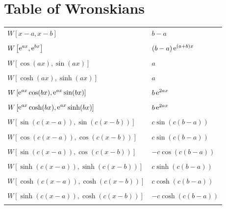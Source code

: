 \raggedbottom
\chapter{Table of Wronskians}
\raggedbottom 


\setlongtables
\begin{longtable}{ll}
  $\displaystyle W \left[ x-a, x-b \right]$
  & $\displaystyle b-a$ \\
  \\
  $\displaystyle W \left[ \mathop{\mathrm{e}}\nolimits^{a x}, \mathop{\mathrm{e}}\nolimits^{b x} \right]$
  & $\displaystyle (b-a) \mathop{\mathrm{e}}\nolimits^{(a+b) x}$ \\
  \\
  $\displaystyle W \left[ \cos(a x), \sin(a x) \right]$
  & $\displaystyle a$ \\
  \\
  $\displaystyle W \left[ \cosh(a x), \sinh(a x) \right]$
  & $\displaystyle a$ \\
  \\
  $\displaystyle W \left[ \mathop{\mathrm{e}}\nolimits^{a x} \cos(b x), \mathop{\mathrm{e}}\nolimits^{a x} \sin(b x) \right]$
  & $\displaystyle b \mathop{\mathrm{e}}\nolimits^{2 a x}$ \\
  \\
  $\displaystyle W \left[ \mathop{\mathrm{e}}\nolimits^{a x} \cosh(b x), \mathop{\mathrm{e}}\nolimits^{a x} \sinh(b x) \right]$
  & $\displaystyle b \mathop{\mathrm{e}}\nolimits^{2 a x}$ \\
  \\
  $\displaystyle W \left[ \sin(c(x-a)), \sin(c(x-b)) \right]$
  & $\displaystyle c \sin(c(b-a))$ \\
  \\
  $\displaystyle W \left[ \cos(c(x-a)), \cos(c(x-b)) \right]$
  & $\displaystyle c \sin(c(b-a))$ \\
  \\
  $\displaystyle W \left[ \sin(c(x-a)), \cos(c(x-b)) \right]$
  & $\displaystyle - c \cos(c(b-a))$ \\
  \\
  $\displaystyle W \left[ \sinh(c(x-a)), \sinh(c(x-b)) \right]$
  & $\displaystyle c \sinh(c(b-a))$ \\
  \\
  $\displaystyle W \left[ \cosh(c(x-a)), \cosh(c(x-b)) \right]$
  & $\displaystyle c \cosh(c(b-a))$ \\
  \\
  $\displaystyle W \left[ \sinh(c(x-a)), \cosh(c(x-b)) \right]$
  & $\displaystyle - c \cosh(c(b-a))$ \\
  \\

\end{longtable}
